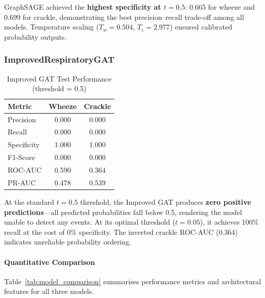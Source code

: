 GraphSAGE achieved the \textbf{highest specificity at $t=0.5$}: 0.665 for
wheeze and 0.699 for crackle, demonstrating the best precision--recall
trade-off among all models. Temperature scaling ($T_w = 0.504$, $T_c = 2.977$)
ensured calibrated probability outputs.

\subsubsection{ImprovedRespiratoryGAT}

\begin{table}[!h]
  \renewcommand{\arraystretch}{1.15}
  \caption{Improved GAT Test Performance (threshold = 0.5)}
  \label{tab:improved_gat_05}
  \centering
  \begin{tabular}{@{}lcc@{}}
    \toprule
    \textbf{Metric} & \textbf{Wheeze} & \textbf{Crackle} \\
    \midrule
    Precision        & 0.000 & 0.000 \\
    Recall           & 0.000 & 0.000 \\
    Specificity      & 1.000 & 1.000 \\
    F1-Score         & 0.000 & 0.000 \\
    ROC-AUC          & 0.590 & 0.364 \\
    PR-AUC           & 0.478 & 0.539 \\
    \bottomrule
  \end{tabular}
\end{table}

At the standard $t=0.5$ threshold, the Improved GAT produces
\textbf{zero positive predictions}---all predicted probabilities fall below
0.5, rendering the model unable to detect any events. At its optimal threshold
($t=0.05$), it achieves 100\% recall at the cost of 0\% specificity. The
inverted crackle ROC-AUC (0.364) indicates unreliable probability ordering.

\paragraph{Quantitative Comparison}
Table~\ref{tab:model_comparison} summarises performance metrics and
architectural features for all three models.

